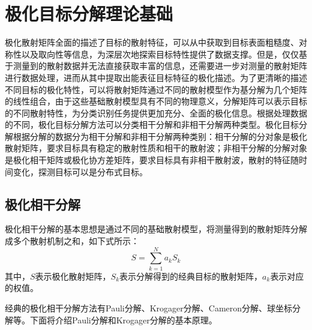 \section{极化目标分解理论基础}
极化散射矩阵全面的描述了目标的散射特征，可以从中获取到目标表面粗糙度、对称性以及取向性等信息，为深层次地探索目标特性提供了数据支撑。但是，仅仅基于测量到的散射数据并无法直接获取丰富的信息，还需要进一步对测量的散射矩阵进行数据处理，进而从其中提取出能表征目标特征的极化描述。为了更清晰的描述不同目标的极化特性，可以将散射矩阵通过不同的散射模型作为基分解为几个矩阵的线性组合，由于这些基础散射模型具有不同的物理意义，分解矩阵可以表示目标的不同散射特性，为分类识别任务提供更加充分、全面的极化信息。根据处理数据的不同，极化目标分解方法可以分类相干分解和非相干分解两种类型。极化目标分解根据分解的数据分为相干分解和非相干分解两种类别：相干分解的分对象是极化散射矩阵，要求目标具有稳定的散射性质和相干的散射波；非相干分解的分解对象是极化相干矩阵或极化协方差矩阵，要求目标具有非相干散射波，散射的特征随时间变化，探测目标可以是分布式目标。
\subsection{极化相干分解}
极化相干分解的基本思想是通过不同的基础散射模型，将测量得到的散射矩阵分解成多个散射机制之和，如下式所示：
\begin{equation}
  S=\sum_{k=1}^N{a_kS_k}
\end{equation}
其中，$S$表示极化散射矩阵，$S_k$表示分解得到的经典目标的散射矩阵，$a_k$表示对应的权值。

经典的极化相干分解方法有Pauli分解、Krogager分解、Cameron分解、球坐标分解等。下面将介绍Pauli分解和Krogager分解的基本原理。
